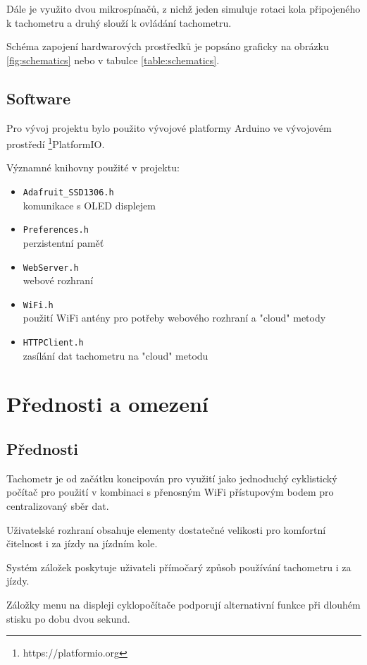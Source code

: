 \documentclass[twocolumn,a4paper,10pt]{article}
\begin{document}
Dále je využito dvou mikrospínačů, z nichž jeden simuluje rotaci kola připojeného k tachometru a druhý slouží k ovládání tachometru.

Schéma zapojení hardwarových prostředků je popsáno graficky na obrázku \ref{fig:schematics} nebo v tabulce \ref{table:schematics}.

\subsection{Software}\label{sec:dependencies_sw}
Pro vývoj projektu bylo použito vývojové platformy Arduino ve vývojovém prostředí \footnote{https://platformio.org}{PlatformIO}.

Významné knihovny použité v projektu:
\begin{itemize}
    \item \texttt{Adafruit\_SSD1306.h} \\komunikace s OLED displejem
    \item \texttt{Preferences.h} \\perzistentní paměť
    \item \texttt{WebServer.h} \\webové rozhraní
    \item \texttt{WiFi.h} \\použití WiFi antény pro potřeby webového rozhraní a "cloud" metody
    \item \texttt{HTTPClient.h} \\zasílání dat tachometru na "cloud" metodu
\end{itemize}

\section{Přednosti a omezení}\label{sec:limits_benefits}
\subsection{Přednosti}\label{subsec:benefits}
Tachometr je od začátku koncipován pro využití jako jednoduchý cyklistický počítač pro použití v kombinaci s přenosným WiFi přístupovým bodem pro centralizovaný sběr dat.

Uživatelské rozhraní obsahuje elementy dostatečné velikosti pro komfortní čitelnost i za jízdy na jízdním kole.

Systém záložek poskytuje uživateli přímočarý způsob používání tachometru i za jízdy.

Záložky menu na displeji cyklopočítače podporují alternativní funkce při dlouhém stisku po dobu dvou sekund.
\end{document}
